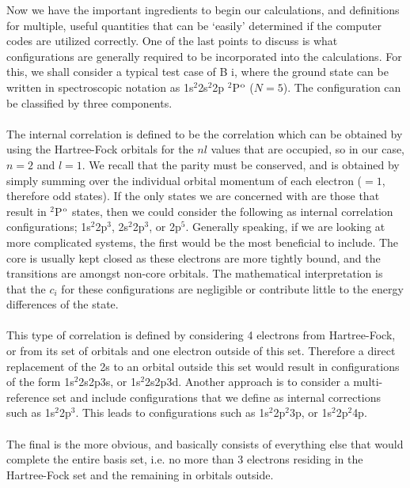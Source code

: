 Now we have the important ingredients to begin our calculations, and definitions for multiple, useful quantities that can be `easily' determined if the computer codes are utilized correctly. One of the last points to discuss is what configurations are generally required to be incorporated into the calculations. For this, we shall consider a typical test case of B {\sc i}, where the ground state can be written in spectroscopic notation as 1s$^2$2s$^2$2p $^2$P$^{{\rm o}}$ ($N=5$). The configuration can be classified by three components.\\

\\
The internal correlation is defined to be the correlation which can be obtained by using the Hartree-Fock orbitals for the $nl$ values that are occupied, so in our case, $n=2$ and $l = 1$. We recall that the parity must be conserved, and is obtained by simply summing over the individual orbital momentum of each electron ($=1$, therefore odd states). If the only states we are concerned with are those that result in $^2$P$^{{\rm o}}$ states, then we could consider the following as internal correlation configurations; 1s$^2$2p$^3$, 2s$^2$2p$^3$, or 2p$^5$. Generally speaking, if we are looking at more complicated systems, the first would be the most beneficial to include. The core is usually kept closed as these electrons are more tightly bound, and the transitions are amongst non-core orbitals. The mathematical interpretation is that the $c_i$ for these configurations are negligible or contribute little to the energy differences of the state.\\

\\
This type of correlation is defined by considering 4 electrons from Hartree-Fock, or from its set of orbitals and one electron outside of this set. Therefore a direct replacement of the 2s to an orbital outside this set would result in configurations of the form 1s$^2$2s2p3s, or 1s$^2$2s2p3d. Another approach is to consider a multi-reference set and include configurations that we define as internal corrections such as 1s$^2$2p$^3$. This leads to configurations such as 1s$^2$2p$^2$3p, or 1s$^2$2p$^2$4p.\\

\\
The final is the more obvious, and basically consists of everything else that would complete the entire basis set, i.e. no more than 3 electrons residing in the Hartree-Fock set and the remaining in orbitals outside. 

